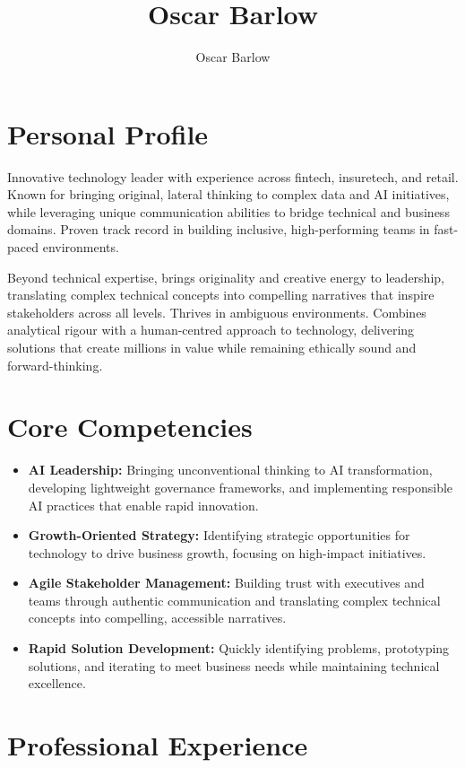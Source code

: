 \documentclass[a4paper]{scrartcl}
\author{Oscar Barlow}
\title{Oscar Barlow}
\date{}
\begin{document}
\maketitle

\section*{Personal Profile}
 { %
  \setlength{\parskip}{6pt plus 2pt minus 1pt}
  Innovative technology leader with experience across fintech, insuretech, and retail. Known for bringing original, lateral thinking to complex data and AI initiatives, while leveraging unique communication abilities to bridge technical and business domains. Proven track record in building inclusive, high-performing teams in fast-paced environments.

  Beyond technical expertise, brings originality and creative energy to leadership, translating complex technical concepts into compelling narratives that inspire stakeholders across all levels. Thrives in ambiguous environments. Combines analytical rigour with a human-centred approach to technology, delivering solutions that create millions in value while remaining ethically sound and forward-thinking.
 } %

\section*{Core Competencies}
\begin{itemize}
	\item \textbf{AI Leadership:} Bringing unconventional thinking to AI transformation, developing lightweight governance frameworks, and implementing responsible AI practices that enable rapid innovation.
	\item \textbf{Growth-Oriented Strategy:} Identifying strategic opportunities for technology to drive business growth, focusing on high-impact initiatives.
	\item \textbf{Agile Stakeholder Management:} Building trust with executives and teams through authentic communication and translating complex technical concepts into compelling, accessible narratives.
	\item \textbf{Rapid Solution Development:} Quickly identifying problems, prototyping solutions, and iterating to meet business needs while maintaining technical excellence.
\end{itemize}

\section*{Professional Experience}
\end{document}
